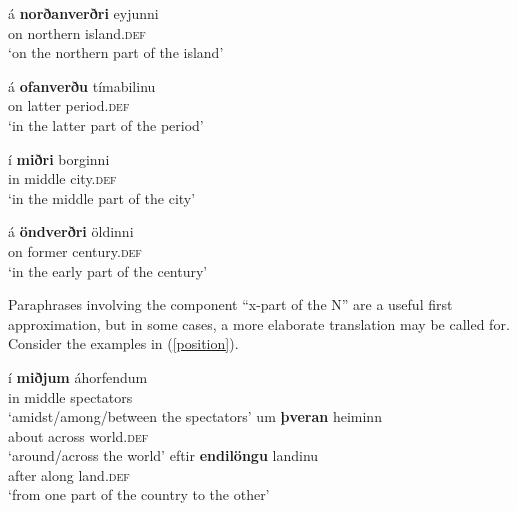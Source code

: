 \documentclass[output=paper,colorlinks,citecolor=brown]{langscibook}
\begin{document}
\begin{exe}
    \ex\label{PosIce1}
       \begin{xlist} %
            \ex \gll á \textbf{norðanverðri} eyjunni \\
               on northern island.\textsc{def}  \\
      \glt `on the northern part of the island'  

    \ex \gll á \textbf{ofanverðu} tímabilinu \\
       on    latter    period.\textsc{def} \\
    \glt `in the latter part of  the period'   

    \ex \gll í \textbf{miðri} borginni     \\ 
       in  middle  city.\textsc{def}  \\
    \glt `in the middle part of the city'  

    \ex \gll á \textbf{öndverðri}  öldinni \\
       on  former century.\textsc{def}   \\
     \glt `in the early part of the century'   
  \end{xlist}
\end{exe} 

Paraphrases involving the component  ``x-part of the N'' are a useful first  approximation, but in some cases, a more elaborate translation may be called for. Consider the examples in (\ref{position}).


\begin{exe}
   \ex\label{position}
     \begin{xlist}  
       \ex \gll í \textbf{miðjum} áhorfendum     \\ 
          in  middle  spectators  \\
         \glt `amidst/among/between the spectators'  
       \ex \gll um \textbf{þveran} heiminn \\
          about  across  world.\textsc{def} \\
       \glt  `around/across the world'     
      \ex \gll eftir \textbf{endilöngu} landinu \\
         after  along  land.\textsc{def} \\
      \glt `from one part of the country to the other'
   \end{xlist}
\end{exe} 
\end{document}
